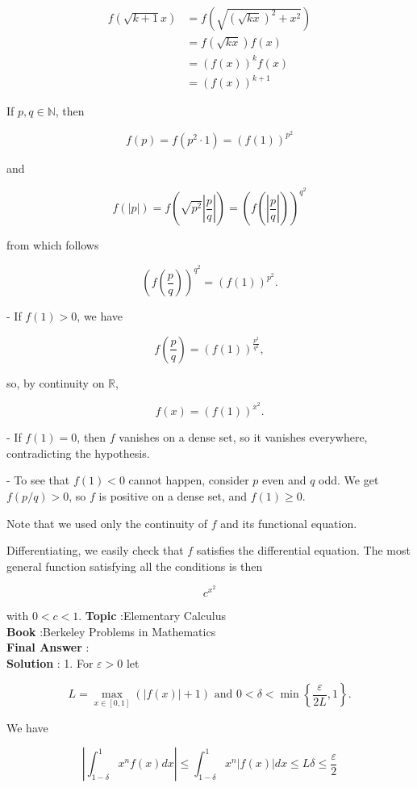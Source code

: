 \documentclass[10pt]{article}
\begin{document}
$$
\begin{aligned}
f(\sqrt{k+1} x) &=f\left(\sqrt{(\sqrt{k x})^{2}+x^{2}}\right) \\
&=f(\sqrt{k x}) f(x) \\
&=(f(x))^{k} f(x) \\
&=(f(x))^{k+1}
\end{aligned}
$$

If $p, q \in \mathbb{N}$, then

$$
f(p)=f\left(p^{2} \cdot 1\right)=(f(1))^{p^{2}}
$$

and

$$
f(|p|)=f\left(\sqrt{p^{2}}\left|\frac{p}{q}\right|\right)=\left(f\left(\left|\frac{p}{q}\right|\right)\right)^{q^{2}}
$$

from which follows

$$
\left(f\left(\frac{p}{q}\right)\right)^{q^{2}}=(f(1))^{p^{2}} .
$$

- If $f(1)>0$, we have

$$
f\left(\frac{p}{q}\right)=(f(1))^{\frac{p^{2}}{q^{2}}},
$$

so, by continuity on $\mathbb{R}$,

$$
f(x)=(f(1))^{x^{2}} .
$$

- If $f(1)=0$, then $f$ vanishes on a dense set, so it vanishes everywhere, contradicting the hypothesis.

- To see that $f(1)<0$ cannot happen, consider $p$ even and $q$ odd. We get $f(p / q)>0$, so $f$ is positive on a dense set, and $f(1) \geqslant 0$.

Note that we used only the continuity of $f$ and its functional equation.

Differentiating, we easily check that $f$ satisfies the differential equation. The most general function satisfying all the conditions is then

$$
c^{x^{2}}
$$

with $0<c<1$.
\textbf{Topic} :Elementary Calculus \\
\textbf{Book} :Berkeley Problems in Mathematics\\
\textbf{Final Answer} :\\


\textbf{Solution} : 1. For $\varepsilon>0$ let

$$
L=\max _{x \in[0,1]}(|f(x)|+1) \text { and } 0<\delta<\min \left\{\frac{\varepsilon}{2 L}, 1\right\} .
$$

We have

$$
\left|\int_{1-\delta}^{1} x^{n} f(x) d x\right| \leqslant \int_{1-\delta}^{1} x^{n}|f(x)| d x \leqslant L \delta \leqslant \frac{\varepsilon}{2}
$$
\end{document}
